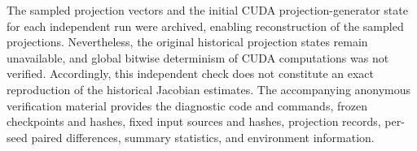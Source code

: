 The sampled projection vectors and the initial CUDA projection-generator state for each independent run were archived, enabling reconstruction of the sampled projections. Nevertheless, the original historical projection states remain unavailable, and global bitwise determinism of CUDA computations was not verified. Accordingly, this independent check does not constitute an exact reproduction of the historical Jacobian estimates. The accompanying anonymous verification material provides the diagnostic code and commands, frozen checkpoints and hashes, fixed input sources and hashes, projection records, per-seed paired differences, summary statistics, and environment information.

